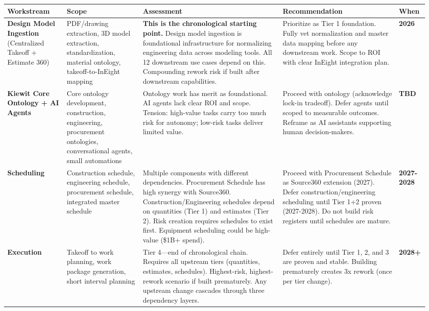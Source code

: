 \documentclass[11pt, letterpaper]{article}
\begin{document}
{\footnotesize
\setlength{\tabcolsep}{4pt}
\begin{tabularx}{\textwidth}{@{} >{\raggedright\arraybackslash}p{2.2cm} >{\raggedright\arraybackslash}p{2.7cm} >{\raggedright\arraybackslash}p{5.2cm} >{\raggedright\arraybackslash}p{4.2cm} >{\raggedright\arraybackslash}p{1.2cm} @{}}
\toprule
\textbf{Workstream} & \textbf{Scope} & \textbf{Assessment} & \textbf{Recommendation} & \textbf{When} \\
\midrule
\textbf{Design Model Ingestion} (Centralized Takeoff + Estimate 360) & PDF/drawing extraction, 3D model extraction, standardization, material ontology, takeoff-to-InEight mapping & \textbf{This is the chronological starting point.} Design model ingestion is foundational infrastructure for normalizing engineering data across modeling tools. All 12 downstream use cases depend on this. Compounding rework risk if built after downstream capabilities. & Prioritize as Tier 1 foundation. Fully vet normalization and master data mapping before any downstream work. Scope to ROI with clear InEight integration plan. & \textbf{2026} \\
\midrule
\textbf{Kiewit Core Ontology + AI Agents} & Core ontology development, construction, engineering, procurement ontologies, conversational agents, small automations & Ontology work has merit as foundational. AI agents lack clear ROI and scope. Tension: high-value tasks carry too much risk for autonomy; low-risk tasks deliver limited value. & Proceed with ontology (acknowledge lock-in tradeoff). Defer agents until scoped to measurable outcomes. Reframe as AI assistants supporting human decision-makers. & \textbf{TBD} \\
\midrule
\textbf{Scheduling} & Construction schedule, engineering schedule, procurement schedule, integrated master schedule & Multiple components with different dependencies. Procurement Schedule has high synergy with Source360. Construction/Engineering schedules depend on quantities (Tier 1) and estimates (Tier 2). Risk creation requires schedules to exist first. Equipment scheduling could be high-value (\$1B+ spend). & Proceed with Procurement Schedule as Source360 extension (2027). Defer construction/engineering scheduling until Tier 1+2 proven (2027-2028). Do not build risk registers until schedules are mature. & \textbf{2027-2028} \\
\midrule
\textbf{Execution} & Takeoff to work planning, work package generation, short interval planning & Tier 4---end of chronological chain. Requires all upstream tiers (quantities, estimates, schedules). Highest-risk, highest-rework scenario if built prematurely. Any upstream change cascades through three dependency layers. & Defer entirely until Tier 1, 2, and 3 are proven and stable. Building prematurely creates 3x rework (once per tier change). & \textbf{2028+} \\

\end{tabularx}}
\end{document}
